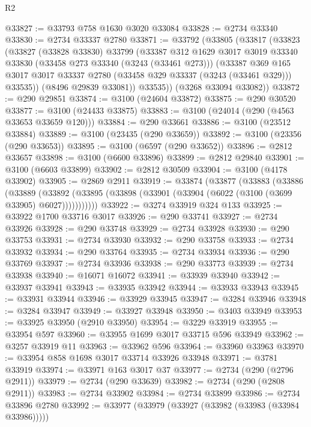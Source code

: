 \begin{lexlean}{R2}
\begin{coremodule}
@33827 := @33793 @758 @1630 @3020 @33084
@33828 := @2734 @33340
@33830 := @2734 @33337 @2780
@33871 := @33792
    (@33805
      (@33817
        (@33823
          (@33827
            (@33828 @33830)
            @33799
            (@33387
              @312
              @1629
              @3017
              @3019
              @33340
              @33830
              (@33458 @273 @33340 (@3243 (@33461 @273)))
              (@33387
                @369
                @165
                @3017
                @3017
                @33337
                @2780
                (@33458 @329 @33337 (@3243 (@33461 @329)))
                @33535))
            (@8496 @29839 @33081))
          @33535))
      (@3268 @33094 @33082))
@33872 := @290 @29851
@33874 := @3100 (@24604 @33872)
@33875 := @290 @30520
@33877 := @3100 (@24433 @33875)
@33883 := @3100 (@24014 (@290 (@4563 @33653 @33659 @120)))
@33884 := @290 @33661
@33886 := @3100 (@23512 @33884)
@33889 := @3100 (@23435 (@290 @33659))
@33892 := @3100 (@23356 (@290 @33653))
@33895 := @3100 (@6597 (@290 @33652))
@33896 := @2812 @33657
@33898 := @3100 (@6600 @33896)
@33899 := @2812 @29840
@33901 := @3100 (@6603 @33899)
@33902 := @2812 @30509
@33904 := @3100 (@4178 @33902)
@33905 := @2869 @2911
@33919 := @33874
    (@33877
      (@33883
        (@33886
          (@33889
            (@33892 (@33895 (@33898 (@33901 (@33904 (@6022 (@3100 (@3699 @33905) @6027)))))))))))
@33922 := @3274 @33919 @324 @133
@33925 := @33922 @1700 @33716 @3017
@33926 := @290 @33741
@33927 := @2734 @33926
@33928 := @290 @33748
@33929 := @2734 @33928
@33930 := @290 @33753
@33931 := @2734 @33930
@33932 := @290 @33758
@33933 := @2734 @33932
@33934 := @290 @33764
@33935 := @2734 @33934
@33936 := @290 @33769
@33937 := @2734 @33936
@33938 := @290 @33773
@33939 := @2734 @33938
@33940 := @16071 @16072
@33941 := @33939 @33940
@33942 := @33937 @33941
@33943 := @33935 @33942
@33944 := @33933 @33943
@33945 := @33931 @33944
@33946 := @33929 @33945
@33947 := @3284 @33946
@33948 := @3284 @33947
@33949 := @33927 @33948
@33950 := @3403 @33949
@33953 := @33925 @33950 (@2910 @33950)
@33954 := @3229 @33919
@33955 := @33954 @597
@33960 := @33955 @1699 @3017 @33715 @596 @33949
@33962 := @3257 @33919 @11
@33963 := @33962 @596
@33964 := @33960 @33963
@33970 := @33954 @858 @1698 @3017 @33714 @33926 @33948
@33971 := @3781 @33919
@33974 := @33971 @163 @3017 @37
@33977 := @2734 (@290 (@2796 @2911))
@33979 := @2734 (@290 @33639)
@33982 := @2734 (@290 (@2808 @2911))
@33983 := @2734 @33902
@33984 := @2734 @33899
@33986 := @2734 @33896 @2780
@33992 := @33977 (@33979 (@33927 (@33982 (@33983 (@33984 @33986)))))

\end{coremodule}
\end{lexlean}
